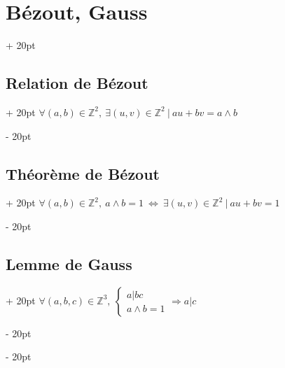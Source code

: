 \documentclass[a4paper, 12pt, twoside]{article}
\newcommand{\Z}{\mathbb{Z}} %
\newcommand{\ssi}{\ \Leftrightarrow \ }
\newcommand{\eqsys}[2]{\begin{cases} #1 \\ #2 \end{cases}}
\newcommand{\ind}[1][20pt]{\advance\leftskip + #1}
\newcommand{\deind}[1][20pt]{\advance\leftskip - #1}
\newenvironment{indt}[2][20pt]{#2 \par \ind[#1]}{\par \deind} %
\begin{document}
    
    \vspace{12pt}
    
    \begin{indt}{\section{Bézout, Gauss}}
        
        \begin{indt}{\subsection{Relation de Bézout}}
            $\forall (a, b) \in \Z^2,\ \exists (u, v) \in \Z^2\ |\ au + bv = a \wedge b$
        \end{indt}
        
        \vspace{6pt}
        
        \begin{indt}{\subsection{Théorème de Bézout}}
            $\forall (a, b) \in \Z^2,\ a \wedge b = 1 \ssi \exists (u, v) \in \Z^2\ |\ au + bv = 1$
        \end{indt}
        
        \vspace{6pt}
        
        \begin{indt}{\subsection{Lemme de Gauss}}
            $\forall (a, b, c) \in \Z^3,\ \eqsys{a|bc}{a \wedge b = 1} \Rightarrow a|c$
        \end{indt}
        
    \end{indt}
    
    \vspace{12pt}
    
\end{document}
